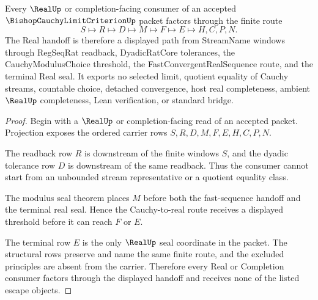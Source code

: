 \begin{theorem}
\label{thm:bishop-cauchy-limit-criterion-real-handoff}
Every $\RealUp$ or completion-facing consumer of an accepted $\BishopCauchyLimitCriterionUp$ packet factors through the finite route
$$
S \longmapsto R \longmapsto D \longmapsto M \longmapsto F \longmapsto E \longmapsto H,C,P,N .
$$
The Real handoff is therefore a displayed path from StreamName windows through RegSeqRat readback, DyadicRatCore tolerances, the CauchyModulusChoice threshold, the FastConvergentRealSequence route, and the terminal Real seal. It exports no selected limit, quotient equality of Cauchy streams, countable choice, detached convergence, host real completeness, ambient $\RealUp$ completeness, Lean verification, or standard bridge.
\end{theorem}
\begin{proof}
Begin with a $\RealUp$ or completion-facing read of an accepted packet. Projection exposes the ordered carrier rows $S,R,D,M,F,E,H,C,P,N$.

The readback row $R$ is downstream of the finite windows $S$, and the dyadic tolerance row $D$ is downstream of the same readback. Thus the consumer cannot start from an unbounded stream representative or a quotient equality class.

The modulus seal theorem places $M$ before both the fast-sequence handoff and the terminal real seal. Hence the Cauchy-to-real route receives a displayed threshold before it can reach $F$ or $E$.

The terminal row $E$ is the only $\RealUp$ seal coordinate in the packet. The structural rows preserve and name the same finite route, and the excluded principles are absent from the carrier. Therefore every Real or Completion consumer factors through the displayed handoff and receives none of the listed escape objects.
\end{proof}


